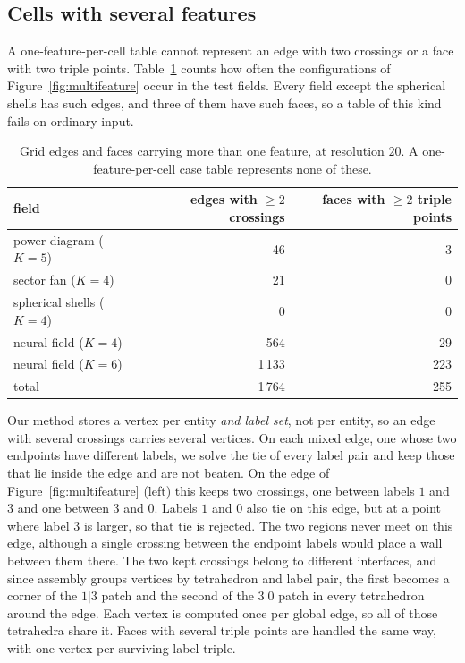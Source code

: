 \documentclass[11pt]{article}
\theoremstyle{definition}
\begin{document}
\subsection{Cells with several features}

A one-feature-per-cell table cannot represent an edge with two crossings or a
face with two triple points. Table~\ref{tab:multiplicity} counts how often
the configurations of Figure~\ref{fig:multifeature} occur in the test fields.
Every field except the spherical shells has such edges, and three of them have
such faces, so a table of this kind fails on ordinary input.

\begin{table}[htbp]
\centering
\caption{Grid edges and faces carrying more than one feature, at resolution
$20$. A one-feature-per-cell case table represents none of these.}
\label{tab:multiplicity}
\begin{tabular}{@{}lrr@{}}
\toprule
field & edges with $\ge 2$ crossings & faces with $\ge 2$ triple points \\
\midrule
power diagram ($K=5$)  & 46 & 3 \\
sector fan ($K=4$)     & 21 & 0 \\
spherical shells ($K=4$) & 0 & 0 \\
neural field ($K=4$)   & 564 & 29 \\
neural field ($K=6$)   & 1\,133 & 223 \\
\midrule
total & 1\,764 & 255 \\
\bottomrule
\end{tabular}
\end{table}

Our method stores a vertex per entity \emph{and label set}, not per entity, so
an edge with several crossings carries several vertices. On each mixed
edge, one whose two endpoints have different labels, we solve the tie of every label pair and keep those that lie inside the
edge and are not beaten. On the edge of Figure~\ref{fig:multifeature} (left)
this keeps two crossings, one between labels $1$ and $3$ and one between $3$
and $0$. Labels $1$ and $0$ also tie on this edge, but at a point where label
$3$ is larger, so that tie is rejected. The two regions never meet on this
edge, although a single crossing between the endpoint labels would place a
wall between them there. The two kept crossings belong to different interfaces, and
since assembly groups vertices by tetrahedron and label pair, the first
becomes a corner of the $1|3$ patch and the second of the $3|0$ patch
in every tetrahedron around the edge. Each vertex is computed once per global
edge, so all of those tetrahedra share it. Faces with several triple points
are handled the same way, with one vertex per surviving label triple.
\end{document}
